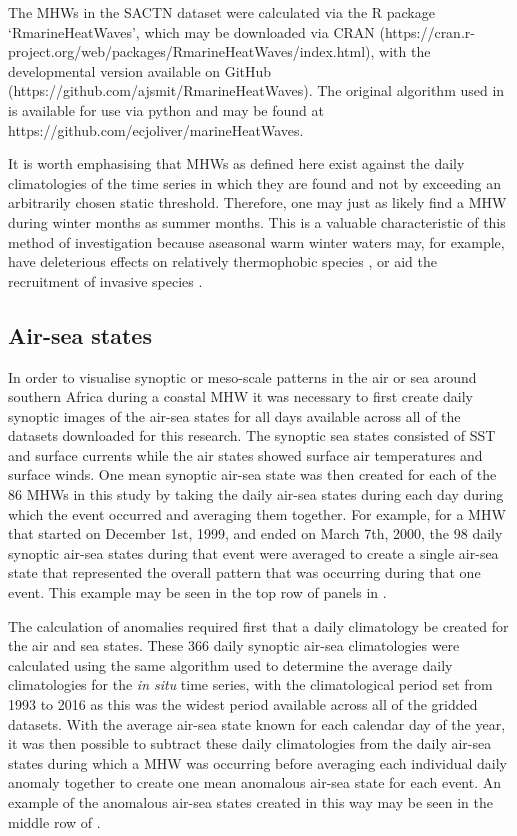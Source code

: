 \documentclass[a4paper,10pt,review]{elsarticle}
\begin{document}
The MHWs in the SACTN dataset were calculated via the R package `RmarineHeatWaves', which may be downloaded via CRAN (https://cran.r-project.org/web/packages/RmarineHeatWaves/index.html), with the developmental version available on GitHub (https://github.com/ajsmit/RmarineHeatWaves). The original algorithm used in \citet{Hobday2016} is available for use via python and may be found at https://github.com/ecjoliver/marineHeatWaves.

It is worth emphasising that MHWs as defined here exist against the daily climatologies of the time series in which they are found and not by exceeding an arbitrarily chosen static threshold. Therefore, one may just as likely find a MHW during winter months as summer months. This is a valuable characteristic of this method of investigation because aseasonal warm winter waters may, for example, have deleterious effects on relatively thermophobic species \citep{Wernberg2011}, or aid the recruitment of invasive species \citep{Stachowicz2002}.

\subsection{Air-sea states}
In order to visualise synoptic or meso-scale patterns in the air or sea around southern Africa during a coastal MHW it was necessary to first create daily synoptic images of the air-sea states for all days available across all of the datasets downloaded for this research. The synoptic sea states consisted of SST and surface currents while the air states showed surface air temperatures and surface winds. One mean synoptic air-sea state was then created for each of the 86 MHWs in this study by taking the daily air-sea states during each day during which the event occurred and averaging them together. For example, for a MHW that started on December 1st, 1999, and ended on March 7th, 2000, the 98 daily synoptic air-sea states during that event were averaged to create a single air-sea state that represented the overall pattern that was occurring during that one event. This example may be seen in the top row of panels in .

The calculation of anomalies required first that a daily climatology be created for the air and sea states. These 366 daily synoptic air-sea climatologies were calculated using the same algorithm used to determine the average daily climatologies for the \emph{in situ} time series, with the climatological period set from 1993 to 2016 as this was the widest period available across all of the gridded datasets. With the average air-sea state known for each calendar day of the year, it was then possible to subtract these daily climatologies from the daily air-sea states during which a MHW was occurring before averaging each individual daily anomaly together to create one mean anomalous air-sea state for each event. An example of the anomalous air-sea states created in this way may be seen in the middle row of .
\end{document}
